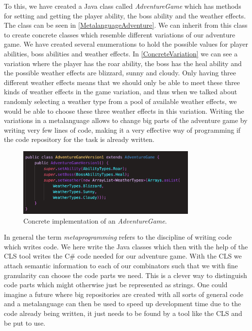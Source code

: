 To this, we have created a Java class called \textit{AdventureGame} which has methods for setting and getting the player ability, the boss ability and the weather effects. The class can be seen in \autoref{MetalanguageAdventure}. We can inherit from this class to create concrete classes which resemble different variations of our adventure game. We have created several enumerations to hold the possible values for player abilities, boss abilities and weather effects. In \autoref{ConcreteVariation} we can see a variation where the player has the roar ability, the boss has the heal ability and the possible weather effects are blizzard, sunny and cloudy. Only having three different weather effects means that we should only be able to meet these three kinds of weather effects in the game variation, and thus when we talked about randomly selecting a weather type from a pool of available weather effects, we would be able to choose these three weather effects in this variation. Writing the variations in a metalanguage allows to change big parts of the adventure game by writing very few lines of code, making it a very effective way of programming if the code repository for the task is already written.
\begin{figure}[H]
	\centering
	\includegraphics[width=0.8\textwidth]{Materials/Adventuregame/Version1}
	\caption{Concrete implementation of an \textit{AdventureGame}.}
	\label{ConcreteVariation}
\end{figure}

In general the term \textit{metaprogramming} refers to the discipline of writing code which writes code. We here write the Java classes which then with the help of the CLS tool writes the C\# code needed for our adventure game. With the CLS we attach semantic information to each of our combinators such that we with fine granularity can choose the code parts we need. This is a clever way to distinguish code parts which might otherwise just be represented as strings. One could imagine a future where big repositories are created with all sorts of general code and a metalanguage can then be used to speed up development time due to the code already being written, it just needs to be found by a tool like the CLS and be put to use.
